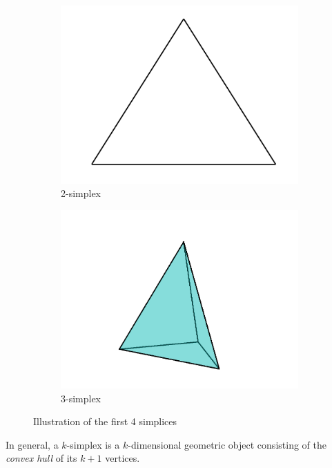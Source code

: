 \begin{figure}[ht]
\begin{subfigure}[b]{0.2\textwidth}
        \centering
        \includegraphics[width=\textwidth]{report/Images/Theory/simplices/simplices2.png}
        \caption{2-simplex}
        \label{fig:2-simplex}
    \end{subfigure}
    \hfill
    \begin{subfigure}[b]{0.2\textwidth}
        \centering
        \includegraphics[width=\textwidth]{report/Images/Theory/simplices/simplices3.png}
        \caption{3-simplex}
        \label{fig:3-simplex}
    \end{subfigure}
    \hfill
    \caption{Illustration of the first 4 simplices}
    \label{fig:simplices}
\end{figure}

In general, a $k$-simplex is a $k$-dimensional geometric object consisting of the \emph{convex hull} of its $k + 1$ vertices.


